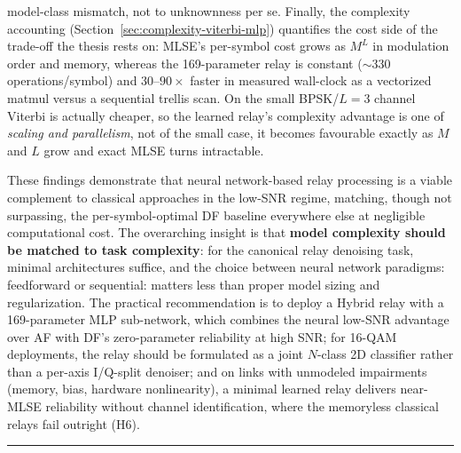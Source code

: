 \begin{itemize}
model-class mismatch, not to unknownness per se. Finally, the complexity accounting (Section~\ref{sec:complexity-viterbi-mlp}) quantifies the cost side of the trade-off the thesis rests on: MLSE's per-symbol cost grows as $M^{L}$ in modulation order and memory, whereas the 169-parameter relay is constant ($\sim$330 operations/symbol) and $30$--$90\times$ faster in measured wall-clock as a vectorized matmul versus a sequential trellis scan. On the small BPSK/$L{=}3$ channel Viterbi is actually cheaper, so the learned relay's complexity advantage is one of \emph{scaling and parallelism}, not of the small case, it becomes favourable exactly as $M$ and $L$ grow and exact MLSE turns intractable.
\end{itemize}

These findings demonstrate that neural network-based relay processing is a viable complement to classical approaches in the low-SNR regime, matching, though not surpassing, the per-symbol-optimal DF baseline everywhere else at negligible computational cost. The overarching insight is that \textbf{model complexity should be matched to task complexity}: for the canonical relay denoising task, minimal architectures suffice, and the choice between neural network paradigms: feedforward or sequential: matters less than proper model sizing and regularization. The practical recommendation is to deploy a Hybrid relay with a 169-parameter MLP sub-network, which combines the neural low-SNR advantage over AF with DF's zero-parameter reliability at high SNR; for 16-QAM deployments, the relay should be formulated as a joint $N$-class 2D classifier rather than a per-axis I/Q-split denoiser; and on links with unmodeled impairments (memory, bias, hardware nonlinearity), a minimal learned relay delivers near-MLSE reliability without channel identification, where the memoryless classical relays fail outright (H6).

\begin{center}\rule{0.5\linewidth}{0.5pt}\end{center}